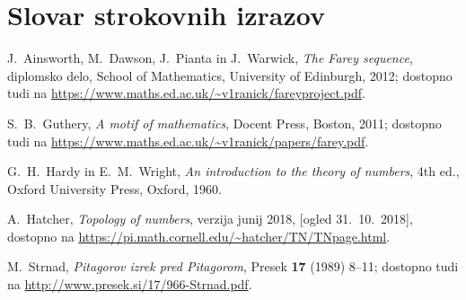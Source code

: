 \documentclass[mat1]{fmfdelo}
\begin{document}

\section*{Slovar strokovnih izrazov}

\geslo{}{}
\geslo{}{}

\begin{thebibliography}{99}

 J.~Ainsworth, M.~Dawson, J.~Pianta in J.~Warwick, \emph{The Farey sequence}, diplomsko delo, School of Mathematics, University of Edinburgh, 2012; dostopno tudi na \url{https://www.maths.ed.ac.uk/~v1ranick/fareyproject.pdf}.

 S.~B.~Guthery, \emph{A motif of mathematics}, Docent Press, Boston, 2011; dostopno tudi na \url{https://www.maths.ed.ac.uk/~v1ranick/papers/farey.pdf}.

 G.~H.~Hardy in E.~M.~Wright, \emph{An introduction to the theory of numbers}, 4th ed., Oxford University Press, Oxford, 1960.

 A.~Hatcher, \emph{Topology of numbers}, verzija junij 2018, [ogled 31.~10.~2018], dostopno na \url{https://pi.math.cornell.edu/~hatcher/TN/TNpage.html}.

 M.~Strnad, \emph{Pitagorov izrek pred Pitagorom}, Presek \textbf{17} (1989) 8--11; dostopno tudi na \url{http://www.presek.si/17/966-Strnad.pdf}.

\end{thebibliography}
\end{document}
